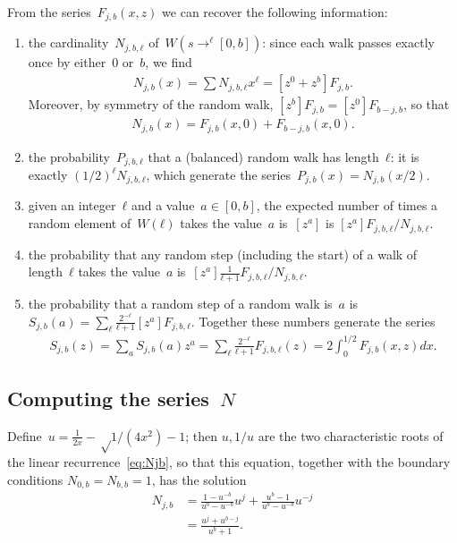 \documentclass{article}
\begin{document}
From the series~$F_{j,b}(x,z)$ we can recover the following information:
\begin{enumerate}
\item the cardinality~$N_{j,b,ℓ}$ of~$W(s→^{ℓ}[0,b])$:
since each walk passes exactly once by either~$0$ or~$b$,
we find
\begin{align}
N_{j,b}(x) = ∑ N_{j,b,ℓ} x^{ℓ} = [z^0 + z^b] F_{j,b}.
\end{align}
Moreover, by symmetry of the random walk,
$[z^b] F_{j,b} = [z^0] F_{b-j,b}$, so that
\begin{align}
N_{j,b}(x) = F_{j,b}(x,0) + F_{b-j,b}(x,0).
\end{align}
\item the probability~$P_{j,b,ℓ}$ that
a (balanced) random walk has length~$ℓ$:
it is exactly $(1/2)^{ℓ} N_{j,b,ℓ}$,
which generate the series~$P_{j,b}(x) = N_{j,b}(x/2)$.
\item given an integer~$ℓ$ and a value~$a ∈ [0,b]$,
the expected number of times a random element of~$W(ℓ)$
takes the value~$a$ is~$[z^a]$
is $[z^a] F_{j,b,ℓ}/N_{j,b,ℓ}$.
\item the probability that any random step (including the start)
of a walk of length~$ℓ$ takes the value~$a$
is~$[z^a] \frac{1}{ℓ+1} F_{j,b,ℓ}/N_{j,b,ℓ}$.
\item the probability that a random step of a random walk is~$a$
is~$S_{j,b}(a) = ∑_{ℓ} \frac{2^{-ℓ}}{ℓ+1} [z^a] F_{j,b,ℓ}$.
Together these numbers generate the series
\begin{align}
S_{j,b}(z) = ∑_{a} S_{j,b}(a) z^a
 = ∑_{ℓ} \frac{2^{-ℓ}}{ℓ+1} F_{j,b,ℓ}(z)
 = 2 ∫_{0}^{1/2} F_{j,b}(x,z) d x.
\end{align}
\end{enumerate}

\subsection{Computing the series~$N$}
Define~$u = \frac{1}{2x} - √{1/(4x^2)-1}$;
then $u, 1/u$ are the two characteristic roots of
the linear recurrence~\eqref{eq:Njb}, so that
this equation, together with the boundary conditions $N_{0,b} = N_{b,b} = 1$,
has the solution
\begin{align}
N_{j,b}
&= \frac{1-u^{-b}}{u^b -u^{-b}} u^j
  +\frac{u^b -1}{u^b -u^{-b}} u^{-j}\\
&= \frac{u^j + u^{b-j}}{u^{b}+1}.
\end{align}
\end{document}

